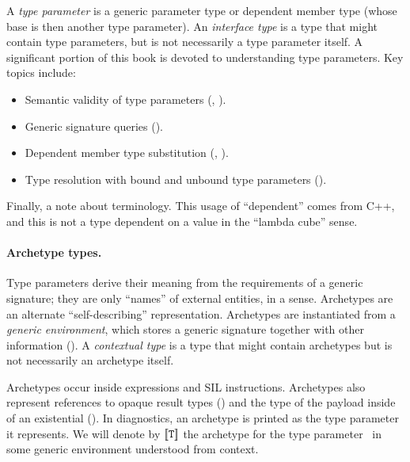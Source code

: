 \documentclass[../generics]{subfiles}
\begin{document}
A \emph{type parameter} is a generic parameter type or dependent member type (whose base is then another type parameter). An \emph{interface type} is a type that might contain type parameters, but is not necessarily a type parameter itself. A significant portion of this book is devoted to understanding type parameters. Key topics include:
\begin{itemize}
\item Semantic validity of type parameters (, ).
\item Generic signature queries ().
\item Dependent member type substitution (, ).
\item Type resolution with bound and unbound type parameters ().
\end{itemize}
Finally, a note about terminology. This usage of ``dependent'' comes from C++, and this is not a type dependent on a value in the ``lambda cube'' sense.

\paragraph{Archetype types.}
Type parameters derive their meaning from the requirements of a generic signature; they are only ``names'' of external entities, in a sense. Archetypes are an alternate ``self-describing'' representation. Archetypes are instantiated from a \emph{generic environment}, which stores a generic signature together with other information (). A \emph{contextual type} is a type that might contain archetypes but is not necessarily an archetype itself.

Archetypes occur inside expressions and SIL instructions. Archetypes also represent references to opaque result types () and the type of the payload inside of an existential (). In diagnostics, an archetype is printed as the type parameter it represents. We will denote by $[\![\texttt{T}]\!]$ the archetype for the type parameter \tT\ in some generic environment understood from context.
\end{document}
